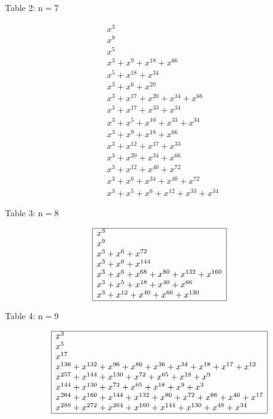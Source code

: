 \documentclass[10pt]{article}
\begin{document}
Table 2: $\mathrm{n}=7$

$$
\begin{aligned}
& x^{3} \\
& x^{9} \\
& x^{5} \\
& x^{3}+x^{9}+x^{18}+x^{66} \\
& x^{5}+x^{18}+x^{34} \\
& x^{3}+x^{6}+x^{20} \\
& x^{3}+x^{17}+x^{20}+x^{34}+x^{66} \\
& x^{3}+x^{17}+x^{33}+x^{34} \\
& x^{3}+x^{5}+x^{10}+x^{33}+x^{34} \\
& x^{3}+x^{9}+x^{18}+x^{66} \\
& x^{3}+x^{12}+x^{17}+x^{33} \\
& x^{3}+x^{20}+x^{34}+x^{66} \\
& x^{3}+x^{12}+x^{40}+x^{72} \\
& x^{3}+x^{6}+x^{34}+x^{40}+x^{72} \\
& x^{3}+x^{5}+x^{6}+x^{12}+x^{33}+x^{34}
\end{aligned}
$$

Table 3: $\mathrm{n}=8$

$$
\begin{array}{|l|}
\hline x^{3} \\
x^{9} \\
x^{3}+x^{6}+x^{72} \\
x^{3}+x^{6}+x^{144} \\
x^{3}+x^{6}+x^{68}+x^{80}+x^{132}+x^{160} \\
x^{3}+x^{5}+x^{18}+x^{40}+x^{66} \\
x^{3}+x^{12}+x^{40}+x^{66}+x^{130} \\
\hline
\end{array}
$$

Table 4: $\mathrm{n}=9$

$$
\begin{array}{|l|}
\hline x^{3} \\
x^{5} \\
x^{17} \\
x^{136}+x^{132}+x^{96}+x^{80}+x^{36}+x^{34}+x^{18}+x^{17}+x^{12} \\
x^{257}+x^{144}+x^{130}+x^{72}+x^{65}+x^{18}+x^{9} \\
x^{144}+x^{130}+x^{72}+x^{65}+x^{18}+x^{9}+x^{3} \\
x^{264}+x^{160}+x^{144}+x^{132}+x^{80}+x^{72}+x^{66}+x^{40}+x^{17} \\
x^{288}+x^{272}+x^{264}+x^{160}+x^{144}+x^{130}+x^{48}+x^{34} \\
\hline
\end{array}
$$
\end{document}
